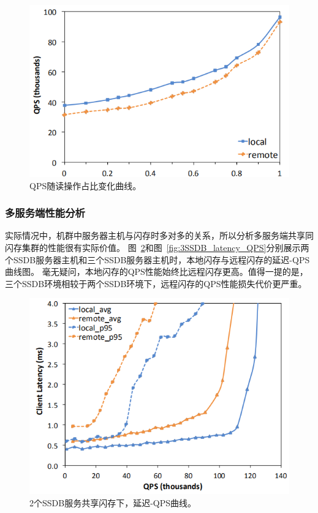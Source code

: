 \begin{figure}
\centering
\includegraphics[scale=0.8]{Figures/storage/QPS_percentage.jpg}
\decoRule
\caption{QPS随读操作占比变化曲线。}
\label{fig:QPS_percentage}
\end{figure}

\subsubsection{多服务端性能分析}
实际情况中，机群中服务器主机与闪存时多对多的关系，所以分析多服务端共享同闪存集群的性能很有实际价值。
图~\ref{fig:2SSDB_latency_QPS}和图~\ref{fig:3SSDB_latency_QPS}分别展示两个SSDB服务器主机和三个SSDB服务器主机时，本地闪存与远程闪存的延迟-QPS曲线图。
毫无疑问，本地闪存的QPS性能始终比远程闪存更高。值得一提的是，三个SSDB环境相较于两个SSDB环境下，远程闪存的QPS性能损失代价更严重。

\begin{figure}
\centering
\includegraphics[scale=0.8]{Figures/storage/2SSDB_latency_QPS.jpg}
\decoRule
\caption{2个SSDB服务共享闪存下，延迟-QPS曲线。}
\label{fig:2SSDB_latency_QPS}
\end{figure}

